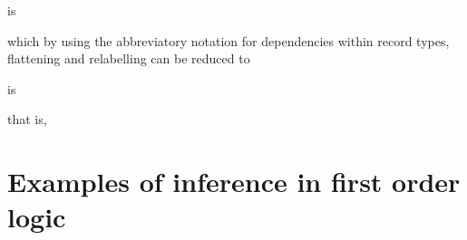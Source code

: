  is
\begin{display}
\end{display}
which by using the abbreviatory notation for dependencies within
record types, flattening and relabelling can be reduced to
\begin{display}
\end{display}
 is
\begin{display}
\end{display}
that is,
\begin{display}
\end{display}

\section{Examples of inference in first order logic}

